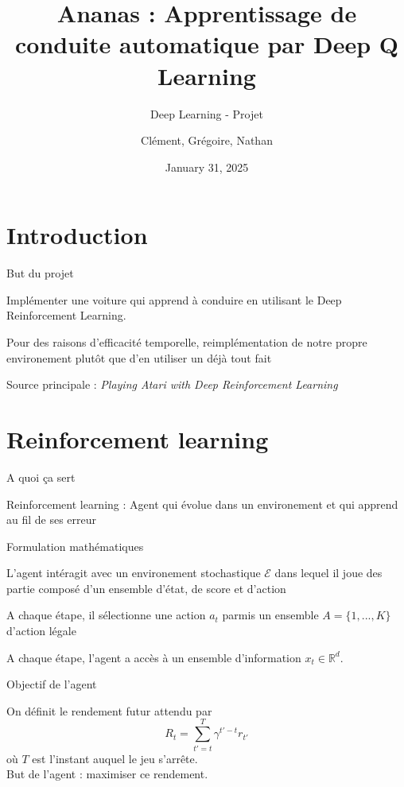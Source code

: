 \documentclass{beamer}
\begin{document}
	
	\title{Ananas : Apprentissage de conduite automatique par Deep Q Learning}
	\subtitle{Deep Learning - Projet}
	\author{Clément, Grégoire, Nathan}
	\date{January 31, 2025}
	
	\maketitle
	
	\section{Introduction}
	
	\begin{frame}{But du projet}
		
		Implémenter une voiture qui apprend à conduire en utilisant le Deep Reinforcement Learning.
		
		Pour des raisons d'efficacité temporelle, reimplémentation de notre propre environement plutôt que d'en utiliser un déjà tout fait
		
		Source principale : \textit{Playing Atari with Deep Reinforcement Learning}
		
	\end{frame}
	
	\section{Reinforcement learning}
	
	\begin{frame}{A quoi ça sert}
		
		Reinforcement learning : Agent qui évolue dans un environement et qui apprend au fil de ses erreur 
	
	\end{frame}
	
	\begin{frame}{Formulation mathématiques}
		
		L'agent intéragit avec un environement stochastique $\mathcal{E}$ dans lequel il joue des partie composé d'un ensemble d'état, de score et d'action
		
		A chaque étape, il sélectionne une action $a_t$ parmis un ensemble $A = \{1, ..., K\}$ d'action légale
		
		A chaque étape, l'agent a accès à un ensemble d'information $x_t \in \mathbb{R}^d$.
	
	\end{frame}
	
	\begin{frame}{Objectif de l'agent}
		
		On définit le rendement futur attendu par
		$$R_t = \sum_{t' = t}^{T}\gamma^{t' - t}r_{t'}$$
		où $T$ est l'instant auquel le jeu s'arrête. \\
		But de l'agent : maximiser ce rendement. 
				
	\end{frame}
	
\end{document}
